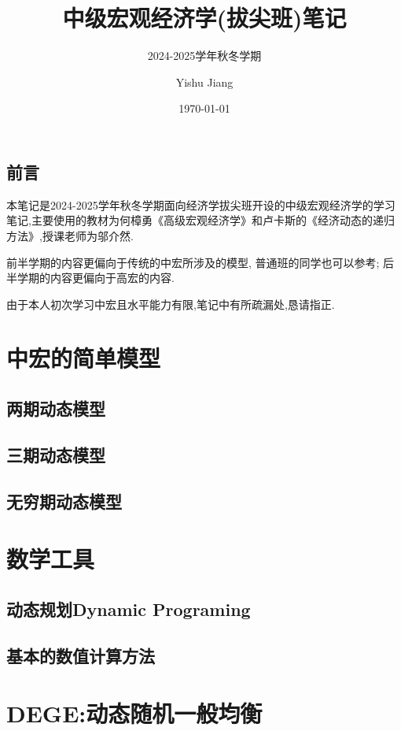 \documentclass[lang=cn,10pt]{elegantbook}
\title{中级宏观经济学(拔尖班)笔记}
\subtitle{2024-2025学年秋冬学期}
\author{Yishu Jiang}
\institute{School of Economics,Zhejiang University}
\date{\today}
\begin{document}
\maketitle
\frontmatter
\chapter*{前言}
{\fangsong 
    本笔记是2024-2025学年秋冬学期面向经济学拔尖班开设的中级宏观经济学的学习笔记,主要使用的教材为何樟勇《高级宏观经济学》和卢卡斯的《经济动态的递归方法》,授课老师为邬介然.
    
    前半学期的内容更偏向于传统的中宏所涉及的模型, 普通班的同学也可以参考; 后半学期的内容更偏向于高宏的内容.

    由于本人初次学习中宏且水平能力有限,笔记中有所疏漏处,恳请指正.
}
\newpage

\tableofcontents

\mainmatter
\part{中宏的简单模型}

\chapter{两期动态模型}
\newpage

\chapter{三期动态模型}
\newpage

\chapter{无穷期动态模型}
\newpage

\part{数学工具}
\chapter{动态规划Dynamic Programing}

\chapter{基本的数值计算方法}

\part{DEGE:动态随机一般均衡}
\end{document}

